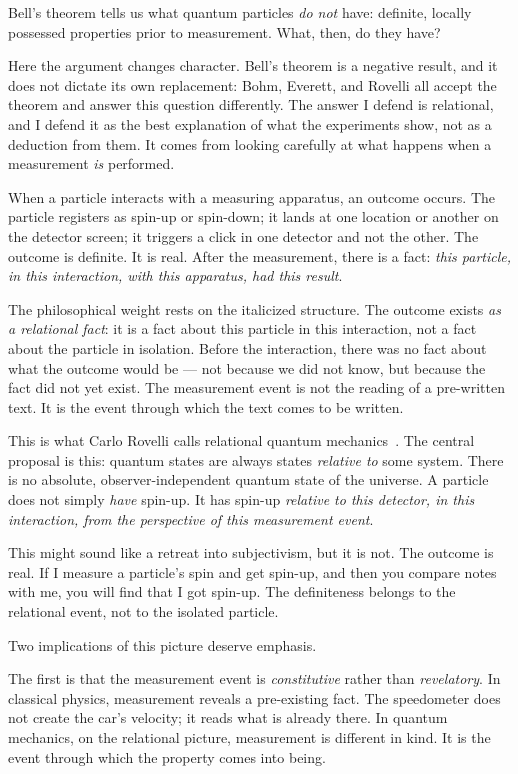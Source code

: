 Bell's theorem tells us what quantum particles \emph{do not} have: definite,
locally possessed properties prior to measurement.
What, then, do they have?

Here the argument changes character.
Bell's theorem is a negative result, and it does not dictate its own
replacement: Bohm, Everett, and Rovelli all accept the theorem and answer this
question differently.
The answer I defend is relational, and I defend it as the best explanation of
what the experiments show, not as a deduction from them.
It comes from looking carefully at what happens when a measurement \emph{is}
performed.

When a particle interacts with a measuring apparatus, an outcome occurs.
The particle registers as spin-up or spin-down; it lands at one location or another
on the detector screen; it triggers a click in one detector and not the other.
The outcome is definite.
It is real.
After the measurement, there is a fact: \emph{this particle, in this interaction,
with this apparatus, had this result}.

The philosophical weight rests on the italicized structure.
The outcome exists \emph{as a relational fact}: it is a fact about this particle
in this interaction, not a fact about the particle in isolation.
Before the interaction, there was no fact about what the outcome would be ---
not because we did not know, but because the fact did not yet exist.
The measurement event is not the reading of a pre-written text.
It is the event through which the text comes to be written.

This is what Carlo Rovelli calls relational quantum mechanics~\citep{Rovelli1996}.
The central proposal is this: quantum states are always states \emph{relative to}
some system.
There is no absolute, observer-independent quantum state of the universe.
A particle does not simply \emph{have} spin-up.
It has spin-up \emph{relative to this detector, in this interaction, from the
perspective of this measurement event}.

This might sound like a retreat into subjectivism, but it is not.
The outcome is real.
If I measure a particle's spin and get spin-up, and then you compare notes with me,
you will find that I got spin-up.
The definiteness belongs to the relational event, not to the isolated particle.

Two implications of this picture deserve emphasis.

The first is that the measurement event is \emph{constitutive} rather than
\emph{revelatory}.
In classical physics, measurement reveals a pre-existing fact.
The speedometer does not create the car's velocity; it reads what is already
there.
In quantum mechanics, on the relational picture, measurement is different in kind.
It is the event through which the property comes into being.

